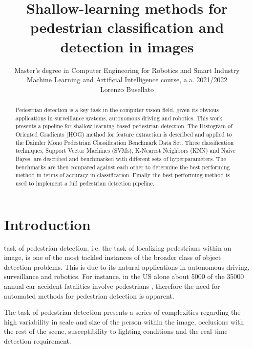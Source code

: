 \documentclass[journal,twocolumn]{IEEEtran}
\begin{document}
\title{Shallow-learning methods for pedestrian classification and detection in images}

\author[1]{Master’s degree in Computer Engineering for Robotics and Smart Industry\\Machine Learning and Artificial Intelligence course, a.a. 2021/2022\\ Lorenzo Busellato}%
\onecolumn

  \maketitle
\begin{abstract} Pedestrian detection is a key task in the computer vision field, given its obvious applications in surveillance systems, autonomous driving and robotics. 
This work presents a pipeline for shallow-learning based pedestrian detection. The Histogram of Oriented Gradients (HOG)
method for feature extraction is described and applied to the Daimler Mono Pedestrian Classification Benchmark Data Set. Three classification
techniques, Support Vector Machines (SVMs), K-Nearest Neighbors (KNN) and Naive Bayes, are described and benchmarked
with different sets of hyperparameters. The benchmarks are then compared against each other to determine the best performing
method in terms of accuracy in classification. Finally the best performing method is used to implement a full pedestrian detection pipeline.
\end{abstract}
  \tableofcontents
  \clearpage
  \twocolumn

\IEEEpeerreviewmaketitle

\section{Introduction}
 task of pedestrian detection, i.e. the task of localizing pedestrians within an image, is one of the most tackled
instances of the broader class of object detection problems.
This is due to its natural applications in autonomous driving,
surveillance and robotics. For instance, in the US alone about
5000 of the 35000 annual car accident fatalities involve
pedestrians \cite{1}, therefore the need for automated methods for
pedestrian detection is apparent.

The task of pedestrian detection presents a series of complexities regarding the high variability in scale and size of the
person within the image, occlusions with the rest of the scene,
susceptibility to lighting conditions and the real time detection
requirement.
\end{document}
